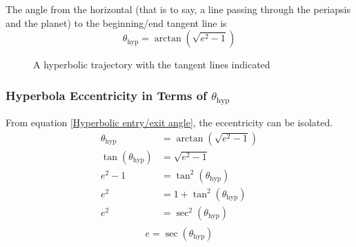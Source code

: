\documentclass{article}
\begin{document}
The angle from the horizontal (that is to say, a line passing through the periapsis and the planet) to the beginning/end tangent line is
\begin{equation}\label{Hyperbolic entry/exit angle}
    \theta_\text{hyp}=\arctan\left(\sqrt{e^2-1}\right)
\end{equation}

\begin{figure}[H]
    \centering
    \caption{A hyperbolic trajectory with the tangent lines indicated}\label{Hyperbola with angles}
\end{figure}

\subsubsection{Hyperbola Eccentricity in Terms of \texorpdfstring{$\theta_\text{hyp}$}{Theta Hyperbolic}}

From equation \eqref{Hyperbolic entry/exit angle}, the eccentricity can be isolated.
\begin{align*}
    \theta_\text{hyp}       & =\arctan\left(\sqrt{e^2-1}\right) \\
    \tan(\theta_\text{hyp}) & =\sqrt{e^2-1}                     \\
    e^2-1                   & =\tan^2(\theta_\text{hyp})        \\
    e^2                     & =1+\tan^2(\theta_\text{hyp})      \\
    e^2                     & =\sec^2(\theta_\text{hyp})        \\
\end{align*}
\begin{equation}\label{Hyperbola Eccentricity}
    e=\sec(\theta_\text{hyp})
\end{equation}
\end{document}
